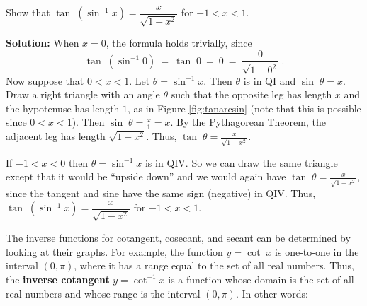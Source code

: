 \begin{exmp}\label{exmp:tanarcsin}
 Show that $\tan\;(\sin^{-1} x) = \dfrac{x}{\sqrt{1 - x^2}}$ for $-1 < x < 1$.

\piccaption[]{\label{fig:tanarcsin}}
 \par\noindent\textbf{Solution:} When $x=0$, the formula holds trivially, since
 \begin{displaymath}
  \tan\;(\sin^{-1} 0) ~=~ \tan\;0 ~=~ 0 ~=~ \dfrac{0}{\sqrt{1 - 0^2}} ~.
 \end{displaymath}
 Now suppose that $0 < x < 1$.
 Let $\theta = \sin^{-1} x$. Then $\theta$ is in QI and $\sin\;\theta = x$. Draw a right
 triangle with an angle $\theta$ such that the opposite leg has length $x$ and the hypotenuse has
 length $1$, as in Figure \ref{fig:tanarcsin} (note that this is possible since $0 < x < 1$). Then
 $\sin\;\theta = \frac{x}{1} = x$. By the Pythagorean Theorem, the adjacent leg has length
 $\sqrt{1 - x^2}$. Thus, $\tan\;\theta = \frac{x}{\sqrt{1 - x^2}}$.
 
 If $-1 < x < 0$ then $\theta = \sin^{-1} x$ is in QIV. So we can draw the same triangle
 except that it would be ``upside down'' and we would again have $\tan\;\theta = \frac{x}{\sqrt{1 - x^2}}$,
 since the tangent and sine have the same sign (negative) in QIV. Thus,
 $\tan\;(\sin^{-1} x) = \dfrac{x}{\sqrt{1 - x^2}}$ for $-1 < x < 1$.
\end{exmp}
\divider
\newpage
The inverse functions for cotangent, cosecant, and secant can be determined by looking at their
graphs. For example, the function $y=\cot\;x$ is one-to-one in the interval $(0,\pi)$, where it
has a range equal to the set of all real numbers. Thus, the \textbf{inverse cotangent} $y=\cot^{-1} x$ is a function whose domain
is the set of all real numbers and whose range is the interval $(0,\pi)$. In other words:

\begin{center}\end{center}

